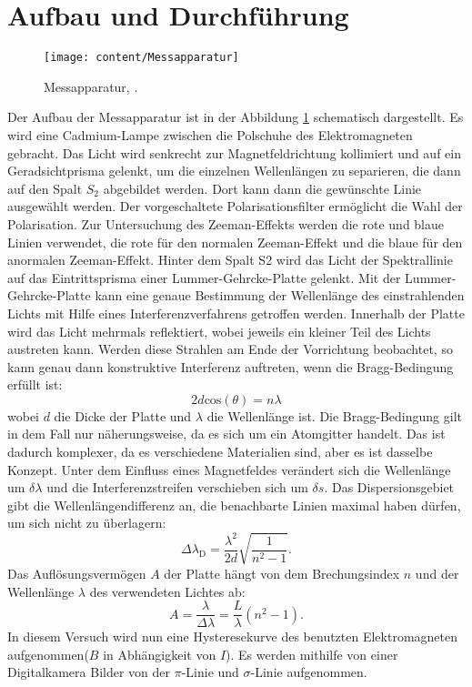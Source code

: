 \section{Aufbau und Durchführung}
\label{sec:AufbauundDurchführung}
\begin{figure}[h!]
	\centering
	\texttt{[image: content/Messapparatur]}
	\caption{Messapparatur, \cite[12]{anleitungV27}.}
	\label{fig:messapparatur}
\end{figure}
Der Aufbau der Messapparatur ist in der Abbildung \ref{fig:messapparatur} schematisch dargestellt. Es wird eine Cadmium-Lampe zwischen die Polschuhe des Elektromagneten gebracht. Das Licht wird senkrecht zur Magnetfeldrichtung kollimiert und auf ein Geradsichtprisma gelenkt, um die einzelnen Wellenlängen zu separieren, die dann auf den Spalt $S_2$ abgebildet werden. Dort kann dann die gewünschte Linie ausgewählt werden. Der vorgeschaltete Polarisationsfilter ermöglicht die Wahl der Polarisation. Zur Untersuchung des Zeeman-Effekts werden die rote und blaue Linien verwendet, die rote für den normalen Zeeman-Effekt und die blaue für den anormalen Zeeman-Effekt. Hinter dem Spalt S2 wird das Licht der Spektrallinie auf das Eintrittsprisma einer Lummer-Gehrcke-Platte gelenkt.
Mit der Lummer-Gehrcke-Platte kann eine genaue Bestimmung der Wellenlänge des einstrahlenden Lichts mit Hilfe eines Interferenzverfahrens getroffen werden. Innerhalb der Platte wird das Licht mehrmals reflektiert, wobei jeweils ein kleiner Teil des Lichts austreten kann. Werden diese Strahlen am Ende der Vorrichtung beobachtet, so kann genau dann konstruktive Interferenz auftreten, wenn die Bragg-Bedingung erfüllt ist:
\begin{equation}
2d\text{cos}(\theta) = n\lambda
\end{equation}
wobei $d$ die Dicke der Platte und $\lambda$ die Wellenlänge ist. Die Bragg-Bedingung gilt in dem Fall nur näherungsweise, da es sich um ein Atomgitter handelt. Das ist dadurch komplexer, da es verschiedene Materialien sind, aber es ist dasselbe Konzept. Unter dem Einfluss eines Magnetfeldes verändert sich die Wellenlänge um $\delta\lambda$ und die Interferenzstreifen verschieben sich um $\delta s$.
Das Dispersionsgebiet gibt die Wellenlängendifferenz an, die benachbarte Linien maximal haben dürfen, um sich nicht zu überlagern:
\begin{equation}
\label{eq:dispersionsgebiet}
\Delta \lambda_\text{D} = \frac{\lambda^2}{2d} \sqrt{\frac{1}{n^2-1}}.
\end{equation}
Das Auflösungsvermögen $A$ der Platte hängt von dem Brechungsindex $n$ und  der Wellenlänge $\lambda$ des verwendeten Lichtes ab:
\begin{equation}
\label{eq:auflösungsvermögen}
A = \frac{\lambda}{\Delta\lambda} = \frac{L}{\lambda}(n^2-1).
\end{equation}
In diesem Versuch wird nun eine Hysteresekurve des benutzten Elektromagneten aufgenommen($B$ in Abhängigkeit von $I$). Es werden mithilfe von einer Digitalkamera Bilder von der $\pi$-Linie und $\sigma$-Linie aufgenommen.